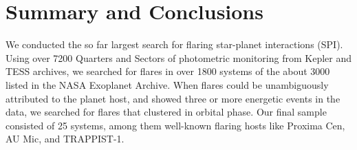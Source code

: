\documentclass[twocolumn]{aastex631}
\begin{document}


\section{Summary and Conclusions}
\label{sec:summary}

We conducted the so far largest search for flaring star-planet interactions (SPI). Using over 7200 Quarters and Sectors of photometric monitoring from Kepler and TESS archives, we searched for flares in over 1800 systems of the about 3000 listed in the NASA Exoplanet Archive. When flares could be unambiguously attributed to the planet host, and showed three or more energetic events in the data, we searched for flares that clustered in orbital phase. Our final sample consisted of 25 systems, among them well-known flaring hosts like Proxima Cen, AU Mic, and TRAPPIST-1. 
\end{document}
